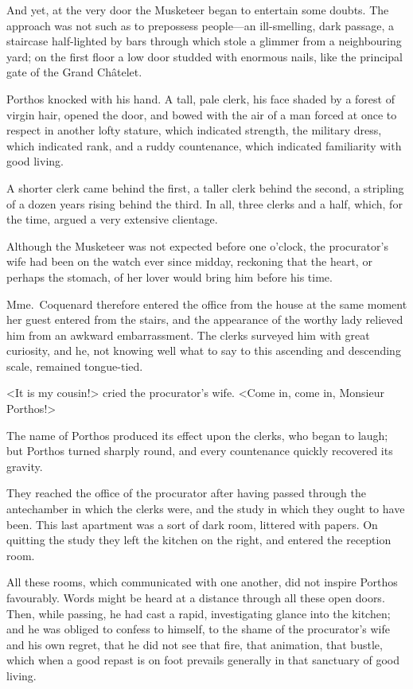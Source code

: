 And yet, at the very door the Musketeer began to entertain some doubts. The approach was not such as to prepossess people—an ill-smelling, dark passage, a staircase half-lighted by bars through which stole a glimmer from a neighbouring yard; on the first floor a low door studded with enormous nails, like the principal gate of the Grand Châtelet. 

Porthos knocked with his hand. A tall, pale clerk, his face shaded by a forest of virgin hair, opened the door, and bowed with the air of a man forced at once to respect in another lofty stature, which indicated strength, the military dress, which indicated rank, and a ruddy countenance, which indicated familiarity with good living. 

A shorter clerk came behind the first, a taller clerk behind the second, a stripling of a dozen years rising behind the third. In all, three clerks and a half, which, for the time, argued a very extensive clientage. 

Although the Musketeer was not expected before one o'clock, the procurator's wife had been on the watch ever since midday, reckoning that the heart, or perhaps the stomach, of her lover would bring him before his time. 

Mme.~Coquenard therefore entered the office from the house at the same moment her guest entered from the stairs, and the appearance of the worthy lady relieved him from an awkward embarrassment. The clerks surveyed him with great curiosity, and he, not knowing well what to say to this ascending and descending scale, remained tongue-tied. 

<It is my cousin!> cried the procurator's wife. <Come in, come in, Monsieur Porthos!> 

The name of Porthos produced its effect upon the clerks, who began to laugh; but Porthos turned sharply round, and every countenance quickly recovered its gravity. 

They reached the office of the procurator after having passed through the antechamber in which the clerks were, and the study in which they ought to have been. This last apartment was a sort of dark room, littered with papers. On quitting the study they left the kitchen on the right, and entered the reception room. 

All these rooms, which communicated with one another, did not inspire Porthos favourably. Words might be heard at a distance through all these open doors. Then, while passing, he had cast a rapid, investigating glance into the kitchen; and he was obliged to confess to himself, to the shame of the procurator's wife and his own regret, that he did not see that fire, that animation, that bustle, which when a good repast is on foot prevails generally in that sanctuary of good living. 

